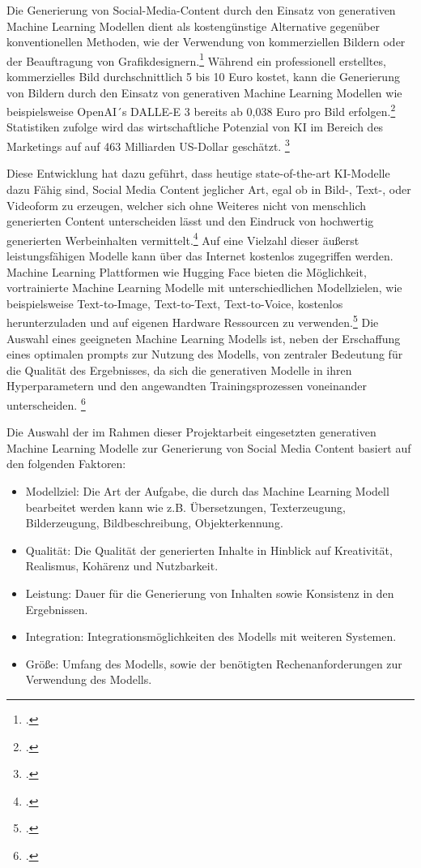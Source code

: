 Die Generierung von Social-Media-Content durch den Einsatz von generativen Machine Learning Modellen dient als kostengünstige Alternative gegenüber konventionellen Methoden, wie der Verwendung von kommerziellen Bildern oder der Beauftragung von Grafikdesignern.\footcite[1-2]{hartmann2024power}
Während ein professionell erstelltes, kommerzielles Bild durchschnittlich 5 bis 10 Euro kostet, kann die Generierung von Bildern durch den Einsatz von generativen Machine Learning Modellen wie beispielsweise OpenAI´s DALLE-E 3 bereits ab 0,038 Euro pro Bild erfolgen.\footcite{betker2023improving}
Statistiken zufolge wird das wirtschaftliche Potenzial von KI im Bereich des Marketings auf auf 463 Milliarden US-Dollar geschätzt. \footcite{chui2023economic}

Diese Entwicklung hat dazu geführt, dass heutige state-of-the-art KI-Modelle dazu Fähig sind, Social Media Content jeglicher Art, egal ob in Bild-, Text-, oder Videoform zu erzeugen, welcher sich ohne Weiteres nicht von menschlich generierten Content unterscheiden lässt und den Eindruck von hochwertig generierten Werbeinhalten vermittelt.\footcite[1]{hartmann2024power}
Auf eine Vielzahl dieser äußerst leistungsfähigen Modelle kann über das Internet kostenlos zugegriffen werden.
Machine Learning Plattformen wie Hugging Face bieten die Möglichkeit, vortrainierte Machine Learning Modelle mit unterschiedlichen Modellzielen, wie beispielsweise Text-to-Image, Text-to-Text, Text-to-Voice, kostenlos herunterzuladen und auf eigenen Hardware Ressourcen zu verwenden.\footcite{huggingface}
Die Auswahl eines geeigneten Machine Learning Modells ist, neben der Erschaffung eines optimalen prompts zur Nutzung des Modells, von zentraler Bedeutung für die Qualität des Ergebnisses, da sich die generativen Modelle in ihren Hyperparametern und den angewandten Trainingsprozessen voneinander unterscheiden. \footcite[S. 9 ff.]{betker2023improving}

Die Auswahl der im Rahmen dieser Projektarbeit eingesetzten generativen Machine Learning Modelle zur Generierung von Social Media Content basiert auf den folgenden Faktoren:

\begin{itemize}
    \item Modellziel: Die Art der Aufgabe, die durch das Machine Learning Modell bearbeitet werden kann wie z.B. Übersetzungen, Texterzeugung, Bilderzeugung, Bildbeschreibung, Objekterkennung.
    \item Qualität: Die Qualität der generierten Inhalte in Hinblick auf Kreativität, Realismus, Kohärenz und Nutzbarkeit.
    \item Leistung: Dauer für die Generierung von Inhalten sowie Konsistenz in den Ergebnissen.
    \item Integration: Integrationsmöglichkeiten des Modells mit weiteren Systemen.
    \item Größe: Umfang des Modells, sowie der benötigten Rechenanforderungen zur Verwendung des Modells.
\end{itemize}

